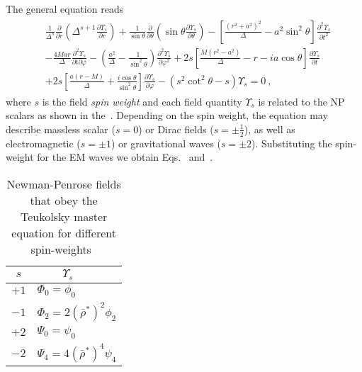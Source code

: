 The general equation reads
\begin{align}
    \begin{split}
        & \frac{1}{\Delta^s} \frac{\partial}{\partial r} \left( \Delta^{s+1} \frac{\partial \Upsilon_s}{\partial r} \right) 
        + \frac{1}{\sin\theta} \frac{\partial}{\partial\theta} \left( \sin\theta \frac{\partial \Upsilon_s}{\partial \theta} \right) 
        - \left[ \frac{(r^2+a^2)^2}{\Delta} - a^2 \sin^2\theta \right]\frac{\partial^2 \Upsilon_s}{\partial t^2} \\[0.15cm]
        & - \frac{4 M a r}{\Delta}\frac{\partial^2 \Upsilon_s}{\partial t \partial \varphi} 
        - \left( \frac{a^2}{\Delta} -\frac{1}{\sin^2\theta} \right)\frac{\partial^2 \Upsilon_s}{\partial \varphi^2} 
        + 2s\left[ \frac{M(r^2-a^2)}{\Delta} - r - i a \cos\theta \right] \frac{\partial \Upsilon_s}{\partial t} \\[0.15cm]
        &+ 2s\left[ \frac{a(r-M)}{\Delta}+\frac{i \cos\theta}{\sin^2\theta}\right] \frac{\partial \Upsilon_s}{\partial \varphi}
        - (s^2 \cot^2\theta - s) \Upsilon_s = 0 ~,
    \end{split}
    \label{eq3:teukolsky}
\end{align}
where $s$ is the field \emph{spin weight} and each field quantity $\Upsilon_s$ is related to the NP scalars as shown in the~.
Depending on the spin weight, the equation may describe massless scalar ($s=0$) or Dirac fields ($s=\pm \tfrac{1}{2}$), as well as electromagnetic ($s=\pm 1$) or gravitational waves ($s=\pm 2$). Substituting the spin-weight for the EM waves we obtain Eqs.~ and~.
\begin{table}[h]
    \centering
    \renewcommand{\arraystretch}{1.25}
    \begin{tabular}{ | c | l | }
        \hline
        $s$ & $\qquad ~ \Upsilon_s$ \\
        \hline\hline
        $+1$ & $\Phi_0 = \phi_0$ \\
        \hline
        $-1$ & $\Phi_2 = 2 (\bar{\rho}^*)^2 \phi_2$ \\
        \hline
        $+2$ & $\Psi_0 = \psi_0$  \\
        \hline
        $-2$ & $\Psi_4 = 4 (\bar{\rho}^*)^4 \psi_4$ \\
        \hline
    \end{tabular}
    \caption{Newman-Penrose fields that obey the Teukolsky master equation for different spin-weights~\cite{Chandrasekhar1998}}
    \label{tb3:solutionsTeukolskyEq}
\end{table}

